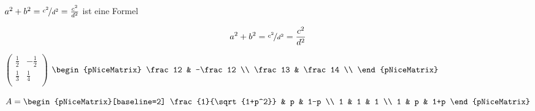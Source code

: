 \documentclass[12pt,ngerman]{scrartcl}
\begin{document}
\(a^2+b^2 = \nicefrac{c^2}{d^2}  = \frac{c^2}{d^2} \) ist eine Formel

\[ a^2 + b^2 = \nicefrac{c^2}{d^2}  = \frac{c^2}{d^2} \] 


$\begin{pmatrix}
\frac12 & -\frac12 \\
\frac13 & \frac14 \\
\end{pmatrix}$
$\begin{pNiceMatrix}
\frac12 & -\frac12 \\
\frac13 & \frac14 \\
\end{pNiceMatrix}$


$A = \begin{pNiceMatrix}[baseline=2] %
\frac{1}{\sqrt{1+p^2}} & p & 1-p \\
1 & 1 & 1 \\
1 & p & 1+p
\end{pNiceMatrix}$
\end{document}
